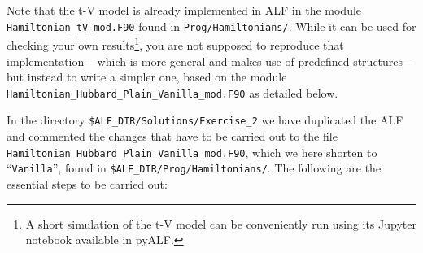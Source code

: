 \documentclass[10pt,modern]{scrartcl}
\numberwithin{exerciseitem}{exercise} %
\begin{document}
Note that the t-V model is already implemented in ALF in the module \texttt{Hamiltonian\_tV\_mod.F90} found in  \texttt{Prog/Hamiltonians/}. While it can be used for checking your own results\footnote{A short simulation of the t-V model can be conveniently run using its Jupyter notebook available in pyALF.}, you are not supposed to reproduce that implementation -- which is more general and makes use of predefined structures -- but instead to write a simpler one, based on the module \texttt{Hamiltonian\_Hubbard\_Plain\_Vanilla\_mod.F90} as detailed below.



In the directory  \texttt{\$ALF\_DIR/Solutions/Exercise\_2} we have  duplicated the ALF and commented  the changes that have to be carried out to the file \texttt{Hamiltonian\_Hubbard\_Plain\_Vanilla\_mod.F90}, which we here shorten to ``\texttt{Vanilla}'', found in \texttt{\$ALF\_DIR/Prog/Hamiltonians/}. The following are the essential steps to be carried out:
\end{document}
